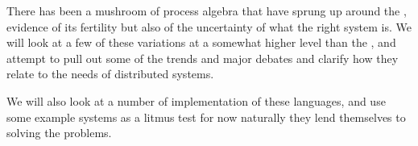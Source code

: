 	There has been a mushroom of process algebra that have sprung up around the \picalc, evidence of its fertility but also of the uncertainty of what the right system is.  We will look at a few of these variations at a somewhat higher level than the \picalc, and attempt to pull out some of the trends and major debates and clarify how they relate to the needs of distributed systems.  
	
	We will also look at a number of implementation of these languages, and use some example systems as a litmus test for now naturally they lend themselves to solving the problems.
